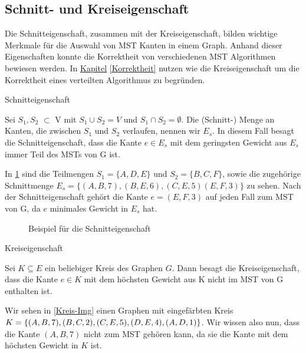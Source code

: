 \subsection{Schnitt- und Kreiseigenschaft}\label{Eigenschaften}

Die Schnitteigenschaft, zusammen mit der Kreiseigenschaft, bilden wichtige Merkmale für die Auswahl von MST Kanten in einem Graph. Anhand dieser Eigenschaften konnte die Korrektheit von verschiedenen MST Algorithmen bewiesen werden.
In \hyperref[Korrektheit]{Kapitel} \ref{Korrektheit} nutzen wie die Kreiseigenschaft um die Korrektheit eines verteilten Algorithmus zu begründen.

\begin{mdframed}
\begin{thm}\label{Schnitteigenschaft}
    Schnitteigenschaft
\end{thm}
Sei $S_1,S_2$ $\subset$ V mit $S_1\cup S_2 = V$ und $S_1\cap S_2 = \emptyset$. Die (Schnitt-) Menge an Kanten, die zwischen $S_1$ und $S_2$ verlaufen, nennen wir $E_s$.
In diesem Fall besagt die Schnitteigenschaft, dass die Kante $e\in E_s$ mit dem geringsten Gewicht aus $E_s$ immer Teil des MSTs von G ist.
\end{mdframed}


In \cref{Schnitt-Img} sind die Teilmengen $S_1=\{A, D, E\}$ und $S_2=\{B, C, F\}$, sowie die zugehörige Schnittmenge $E_s=\{(A,B,7), (B,E,6), (C,E,5) (E,F,3)\}$ zu sehen. Nach der Schnitteigenschaft gehört die Kante $e =(E,F,3)$ auf jeden Fall zum MST von G, da $e$ minimales Gewicht in $E_s$ hat.


\begin{figure}[H]
    \centering
    
    \caption{Beispiel für die Schnitteigenschaft}
    \label{Schnitt-Img}
\end{figure}



\begin{mdframed}
\begin{thm} \label{Kreiseigenschaft}
    Kreiseigenschaft
\end{thm}
Sei $K \subseteq E$ ein beliebiger Kreis des Graphen $G$. Dann besagt die Kreiseigenschaft, dass die Kante $e \in K$ mit dem höchsten Gewicht aus K nicht im MST von G enthalten ist.
\end{mdframed}

Wir sehen in \cref{Kreis-Img} einen Graphen mit eingefärbten Kreis $K =\{(A,B,7), (B,C,2), (C,E,5), \\ (D,E,4), (A,D,1)\}$.
Wir wissen also nun, dass die Kante $(A,B,7)$ nicht zum MST gehören kann, da sie die Kante mit dem höchsten Gewicht in $K$ ist.

